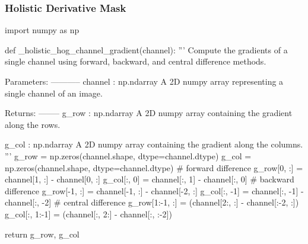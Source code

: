 \subsubsection{Holistic Derivative Mask}\label{appendix:holistic_der_mask}
\begin{pythoncode}
import numpy as np

def _holistic_hog_channel_gradient(channel):
    '''
    Compute the gradients of a single channel using forward, backward, and central difference methods.

    Parameters:
    -----------
    channel : np.ndarray
        A 2D numpy array representing a single channel of an image.

    Returns:
    --------
    g_row : np.ndarray
        A 2D numpy array containing the gradient along the rows.
    
    g_col : np.ndarray
        A 2D numpy array containing the gradient along the columns.
    '''
    g_row = np.zeros(channel.shape, dtype=channel.dtype)
    g_col = np.zeros(channel.shape, dtype=channel.dtype)
    # forward difference
    g_row[0, :] = channel[1, :] - channel[0, :]
    g_col[:, 0] = channel[:, 1] - channel[:, 0]
    # backward difference
    g_row[-1, :] = channel[-1, :] - channel[-2, :]
    g_col[:, -1] = channel[:, -1] - channel[:, -2]
    # central difference
    g_row[1:-1, :] = (channel[2:, :] - channel[:-2, :])
    g_col[:, 1:-1] = (channel[:, 2:] - channel[:, :-2])

    return g_row, g_col
\end{pythoncode}
